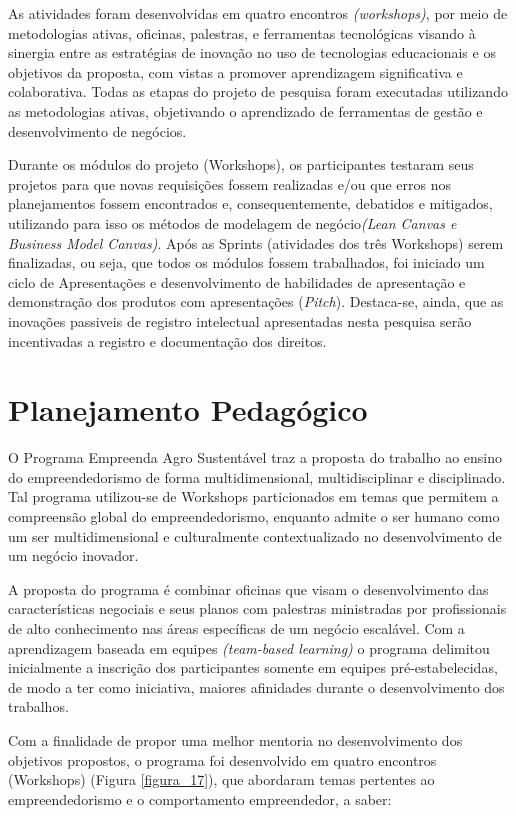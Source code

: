 As atividades foram desenvolvidas em quatro encontros \textit{(workshops)}, por meio de metodologias ativas, oficinas, palestras, e ferramentas tecnológicas visando à sinergia entre as estratégias de inovação no uso de tecnologias educacionais e os objetivos da proposta, com vistas a promover aprendizagem significativa  e colaborativa. Todas as etapas do projeto de pesquisa foram executadas utilizando as metodologias ativas, objetivando o aprendizado de ferramentas de gestão e desenvolvimento de negócios. 

Durante os módulos do projeto (Workshops), os participantes testaram seus projetos para que novas requisições fossem realizadas e/ou que erros nos planejamentos fossem encontrados e, consequentemente, debatidos e mitigados, utilizando para isso os métodos de modelagem de negócio\textit{(Lean Canvas e Business Model Canvas)}. Após as Sprints (atividades dos três Workshops) serem finalizadas, ou seja, que todos os módulos fossem trabalhados, foi iniciado um ciclo de Apresentações e desenvolvimento de habilidades de apresentação e demonstração dos produtos com apresentações (\textit{Pitch}). Destaca-se, ainda, que as inovações passiveis de registro intelectual apresentadas nesta pesquisa serão incentivadas a registro e documentação dos direitos.


\section{Planejamento Pedagógico}

O Programa Empreenda Agro Sustentável traz a proposta do trabalho ao ensino do empreendedorismo de forma multidimensional, multidisciplinar e disciplinado. Tal programa utilizou-se de Workshops particionados em temas que permitem a compreensão global do empreendedorismo, enquanto admite o ser humano como um ser multidimensional e culturalmente contextualizado no desenvolvimento de um negócio inovador. 

A proposta do programa é combinar oficinas que visam o desenvolvimento das características negociais e seus planos com palestras ministradas por profissionais de alto conhecimento nas áreas específicas de um negócio escalável. Com a aprendizagem baseada em equipes \textit{(team-based learning)} o programa delimitou inicialmente a inscrição dos participantes somente em equipes pré-estabelecidas, de modo a ter como iniciativa, maiores afinidades durante o desenvolvimento dos trabalhos. 

Com a finalidade de propor uma melhor mentoria no desenvolvimento dos objetivos propostos, o programa foi desenvolvido em quatro encontros (Workshops) (Figura \ref{figura_17}), que abordaram temas pertentes ao empreendedorismo e o comportamento empreendedor, a saber:

